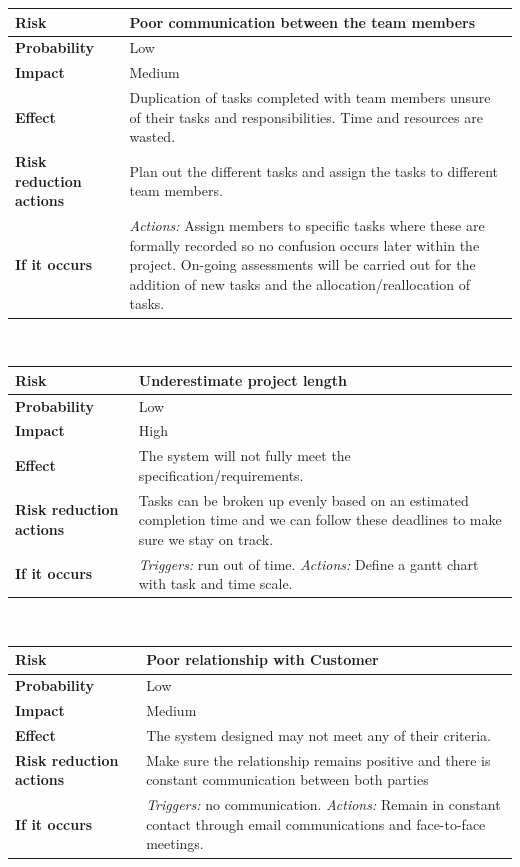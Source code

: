 \noindent
\begin{tabular}{|l || p{10.3cm}|}
\hline
\textbf{Risk} & Poor communication between the team members \\ \hline
\textbf{Probability} & Low \\ \hline
\textbf{Impact} & Medium \\ \hline
\textbf{Effect} & Duplication of tasks completed with team members unsure of their tasks and responsibilities.  Time and resources are wasted.\\ \hline
\textbf{Risk reduction actions} & Plan out the different tasks and assign the tasks to different team members. \\ \hline
\textbf{If it occurs} & \emph{Actions:} Assign members to specific tasks where these are formally recorded so no confusion occurs later within the project.  On-going assessments will be carried out for the addition of new tasks and the allocation/reallocation of tasks.\\ 
\hline
\end{tabular}\\
\vspace{0.5cm}

\noindent
\begin{tabular}{|l || p{10.3cm}|}
\hline
\textbf{Risk} & Underestimate project length \\ \hline
\textbf{Probability} & Low \\ \hline
\textbf{Impact} & High \\ \hline
\textbf{Effect} & The system will not fully meet the specification/requirements.\\ \hline
\textbf{Risk reduction actions} & Tasks can be broken up evenly based on an estimated completion time and we can follow these deadlines to make sure we stay on track. \\ \hline
\textbf{If it occurs} &  \emph{Triggers:} run out of time.  \emph{Actions:} Define a gantt chart with task and time scale.\\ 
\hline
\end{tabular}\\
\vspace{0.5cm}

\noindent
\begin{tabular}{|l || p{10.3cm}|}
\hline
\textbf{Risk} & Poor relationship with Customer \\ \hline
\textbf{Probability} & Low \\ \hline
\textbf{Impact} & Medium \\ \hline
\textbf{Effect} & The system designed may not meet any of their criteria.\\ \hline
\textbf{Risk reduction actions} & Make sure the relationship remains positive and there is constant communication between both parties \\ \hline
\textbf{If it occurs} &  \emph{Triggers:} no communication.  \emph{Actions:} Remain in constant contact through email communications and face-to-face meetings.\\ 
\hline
\end{tabular}\\
\vspace{0.5cm}

